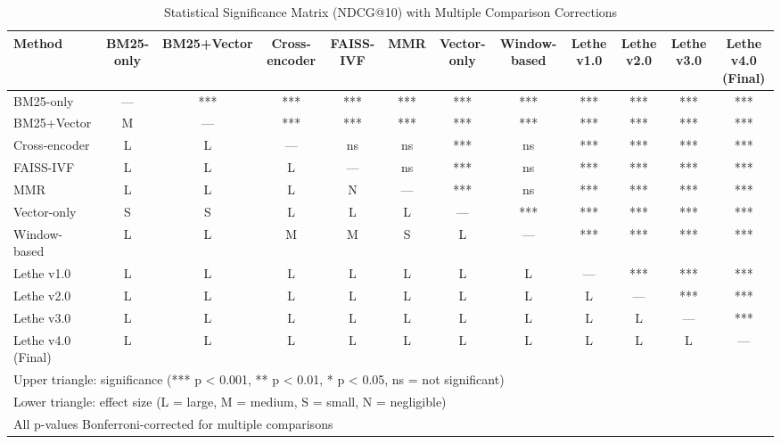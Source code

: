 \begin{table*}[htbp]
\centering
\caption{Statistical Significance Matrix (NDCG@10) with Multiple Comparison Corrections}
\label{tab:significance-matrix}
\begin{tabular}{lccccccccccc}
\toprule
Method & BM25-only & BM25+Vector & Cross-encoder & FAISS-IVF & MMR & Vector-only & Window-based & Lethe v1.0 & Lethe v2.0 & Lethe v3.0 & Lethe v4.0 (Final) \\
\midrule
BM25-only & — & *** & *** & *** & *** & *** & *** & *** & *** & *** & *** \\
BM25+Vector & M & — & *** & *** & *** & *** & *** & *** & *** & *** & *** \\
Cross-encoder & L & L & — & ns & ns & *** & ns & *** & *** & *** & *** \\
FAISS-IVF & L & L & L & — & ns & *** & ns & *** & *** & *** & *** \\
MMR & L & L & L & N & — & *** & ns & *** & *** & *** & *** \\
Vector-only & S & S & L & L & L & — & *** & *** & *** & *** & *** \\
Window-based & L & L & M & M & S & L & — & *** & *** & *** & *** \\
Lethe v1.0 & L & L & L & L & L & L & L & — & *** & *** & *** \\
Lethe v2.0 & L & L & L & L & L & L & L & L & — & *** & *** \\
Lethe v3.0 & L & L & L & L & L & L & L & L & L & — & *** \\
Lethe v4.0 (Final) & L & L & L & L & L & L & L & L & L & L & — \\
\bottomrule
\multicolumn{12}{l}{\small Upper triangle: significance (*** p < 0.001, ** p < 0.01, * p < 0.05, ns = not significant)} \\
\multicolumn{12}{l}{\small Lower triangle: effect size (L = large, M = medium, S = small, N = negligible)} \\
\multicolumn{12}{l}{\small All p-values Bonferroni-corrected for multiple comparisons} \\
\end{tabular}
\end{table*}

